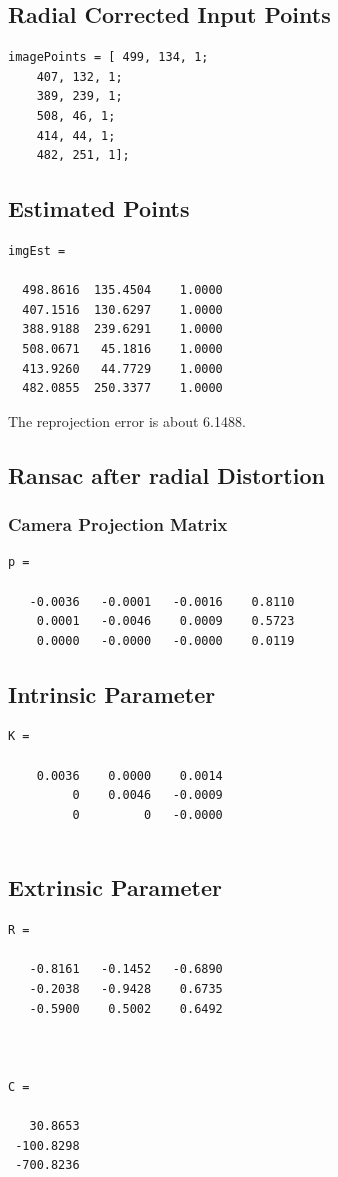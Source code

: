 \documentclass[12pt]{article}
\begin{document}
\subsection{Radial Corrected Input Points}
\begin{lstlisting}
imagePoints = [ 499, 134, 1;
    407, 132, 1;
    389, 239, 1;
    508, 46, 1;
    414, 44, 1;
    482, 251, 1];
\end{lstlisting}

\subsection{Estimated Points}
 \begin{lstlisting}
imgEst =

  498.8616  135.4504    1.0000
  407.1516  130.6297    1.0000
  388.9188  239.6291    1.0000
  508.0671   45.1816    1.0000
  413.9260   44.7729    1.0000
  482.0855  250.3377    1.0000
\end{lstlisting}

The reprojection error is about 6.1488.

\subsection{Ransac after radial Distortion}
\subsubsection{Camera Projection Matrix}
\begin{lstlisting}
p =

   -0.0036   -0.0001   -0.0016    0.8110
    0.0001   -0.0046    0.0009    0.5723
    0.0000   -0.0000   -0.0000    0.0119

\end{lstlisting}

\subsection{Intrinsic Parameter}
\begin{lstlisting}
K =

    0.0036    0.0000    0.0014
         0    0.0046   -0.0009
         0         0   -0.0000
         
\end{lstlisting}
\subsection{Extrinsic Parameter}
\begin{lstlisting}
R =

   -0.8161   -0.1452   -0.6890
   -0.2038   -0.9428    0.6735
   -0.5900    0.5002    0.6492



C =

   30.8653
 -100.8298
 -700.8236
 \end{lstlisting}
\end{document}
